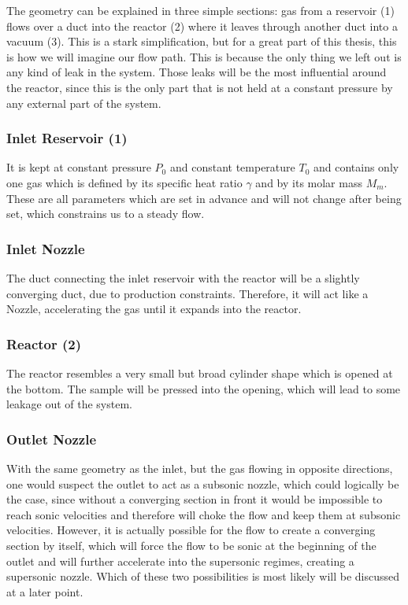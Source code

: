 	The geometry can be explained in three simple sections: gas from a reservoir (1) flows over a duct into the reactor (2) where it leaves through another duct into a vacuum (3).
	This is a stark simplification, but for a great part of this thesis, this is how we will imagine our flow path.
	This is because the only thing we left out is any kind of leak in the system.
	Those leaks will be the most influential around the reactor, since this is the only part that is not held at a constant pressure by any external part of the system.\\
	

\subsubsection{Inlet Reservoir (1)}

	It is kept at constant pressure \(P_0\) and constant temperature \(T_0\) and contains only one gas which is defined by its specific heat ratio \(\gamma\) and by its molar mass \(M_m\).
	These are all parameters which are set in advance and will not change after being set, which constrains us to a steady flow.
	
\subsubsection{Inlet Nozzle}

	The duct connecting the inlet reservoir with the reactor will be a slightly converging duct, due to production constraints.
	Therefore, it will act like a Nozzle, accelerating the gas until it expands into the reactor.
	
\subsubsection{Reactor (2)}
	
	The reactor resembles a very small but broad cylinder shape which is opened at the bottom.
	The sample will be pressed into the opening, which will lead to some leakage out of the system.
	
\subsubsection{Outlet Nozzle}
	
	With the same geometry as the inlet, but the gas flowing in opposite directions, one would suspect the outlet to act as a subsonic nozzle, which could logically be the case, since without a converging section in front it would be impossible to reach sonic velocities and therefore will choke the flow and keep them at subsonic velocities.
	However, it is actually possible for the flow to create a converging section by itself, which will force the flow to be sonic at the beginning of the outlet and will further accelerate into the supersonic regimes, creating a supersonic nozzle.
	Which of these two possibilities is most likely will be discussed at a later point.
	
